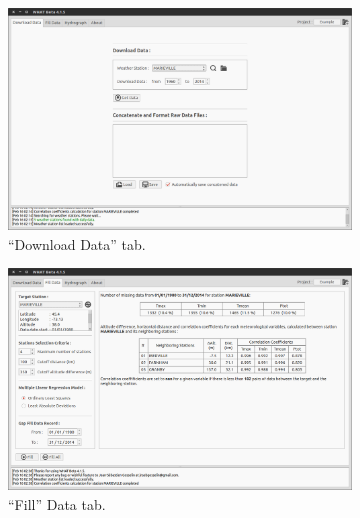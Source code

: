 \documentclass[12pt, letterpaper, fleqn]{report}
\begin{document}
\begin{figure}[h!]
        \centering
        \begin{subfigure}[t]{0.45\textwidth}
                \includegraphics[width=\textwidth]{WHAT_Screenshot000}
                \caption{``Download Data'' tab.}
                \label{subfig:ScnShot_000}                
        \end{subfigure}%
        \hspace{0.5cm}
        \begin{subfigure}[t]{0.45\textwidth}
                \includegraphics[width=\textwidth]{WHAT_Screenshot001}
                \caption{``Fill'' Data tab.}
                \label{subfig:ScnShot_001}
        \end{subfigure}
        \\[0.5cm]
        \begin{subfigure}[t]{0.45\textwidth}

\end{subfigure}
\end{figure}
\end{document}

